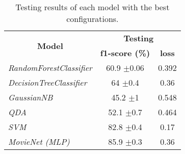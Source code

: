 \documentclass[../main]{subfiles}
\begin{document}
\begin{table}[!ht]
    \center
    \begin{tabular}{|l|cc|}
        \hline
        \multicolumn{1}{|c|}{\multirow{2}{*}{\textbf{Model}}} & \multicolumn{2}{c|}{\textbf{Testing}}               \\
        \cline{2-3} 
        \multicolumn{1}{|c|}{}                                & \multicolumn{1}{c|}{\textbf{f1-score (\%)}} & \textbf{loss}  \\ 
        \hline
        \textit{RandomForestClassifier}                       & \multicolumn{1}{c|}{60.9 $\pm$0.06}             & 0.392 \\
        \hline
        \textit{DecisionTreeClassifier}                       & \multicolumn{1}{c|}{64 $\pm$0.4}                & 0.36  \\
        \hline
        \textit{GaussianNB}                                   & \multicolumn{1}{c|}{45.2 $\pm$1}                & 0.548 \\
        \hline
        \textit{QDA}                                          & \multicolumn{1}{c|}{52.1 $\pm$0.7}              & 0.464 \\
        \hline
        \textit{SVM}                                          & \multicolumn{1}{c|}{82.8 $\pm$0.4}              & 0.17  \\
        \hline
        \textit{MovieNet (MLP)}                                     & \multicolumn{1}{c|}{85.9 $\pm$0.3}              & 0.36  \\ \hline
    \end{tabular}
    \caption{Testing results of each model with the best configurations.}
    \label{table:test_results}
\end{table}
\end{document}
